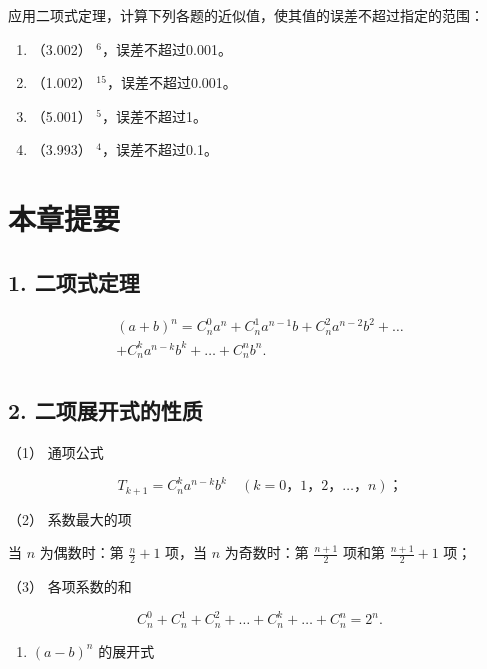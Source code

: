 应用二项式定理，计算下列各题的近似值，使其值的误差不超过指定的范围：

\begin{enumerate}[start=7]
\item
  （3.002） \(^{6}\)，误差不超过0.001。
\item
  （1.002） \(^{15}\)，误差不超过0.001。
\item
  （5.001） \(^{5}\)，误差不超过1。
\item
  （3.993） \(^{4}\)，误差不超过0.1。
\end{enumerate}

\section{本章提要}

\subsection{1. 二项式定理}

\[
\begin{array}{l} (a + b) ^ {n} = C _ {n} ^ {0} a ^ {n} + C _ {n} ^ {1} a ^ {n - 1} b + C _ {n} ^ {2} a ^ {n - 2} b ^ {2} + \dots \\ + C _ {n} ^ {k} a ^ {n - k} b ^ {k} + \dots + C _ {n} ^ {n} b ^ {n}. \\ \end{array}
\]

\subsection{2. 二项展开式的性质}

（1） 通项公式

\[
T _ {k + 1} = C _ {n} ^ {k} a ^ {n - k} b ^ {k} \quad (k = 0\text{，} 1\text{，} 2\text{，} \dots \text{，} n)\text{；}
\]

（2） 系数最大的项

当 \(n\) 为偶数时：第 \(\frac{n}{2} + 1\) 项，当 \(n\) 为奇数时：第
\(\frac{n + 1}{2}\) 项和第 \(\frac{n + 1}{2} + 1\) 项；

（3） 各项系数的和

\[
C _ {n} ^ {0} + C _ {n} ^ {1} + C _ {n} ^ {2} + \dots + C _ {n} ^ {k} + \dots + C _ {n} ^ {n} = 2 ^ {n}.
\]

\begin{enumerate}[start=3]
\item
  \((a - b)^n\) 的展开式
\end{enumerate}


